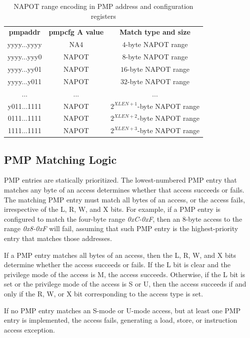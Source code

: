 \begin{table}
  \centering
  \begin{tabular}{|c|c|c|}
    \hline
    \textbf{pmpaddr}          & \textbf{pmpcfg A value} & \textbf{Match type and size}  \\
    \hhline {===} yyyy...yyyy & NA4                     & $4$-byte NAPOT range          \\
    \hline
    yyyy...yyy0               & NAPOT                   & $8$-byte NAPOT range          \\
    \hline
    yyyy...yy01               & NAPOT                   & $16$-byte NAPOT range         \\
    \hline
    yyyy...y011               & NAPOT                   & $32$-byte NAPOT range         \\
    \hline
    ...                       & ...                     & ...                           \\
    \hline
    y011...1111               & NAPOT                   & $2^{XLEN+1}$-byte NAPOT range \\
    \hline
    0111...1111               & NAPOT                   & $2^{XLEN+2}$-byte NAPOT range \\
    \hline
    1111...1111               & NAPOT                   & $2^{XLEN+3}$-byte NAPOT range \\
    \hline
  \end{tabular}
  \caption{NAPOT range encoding in PMP address and configuration registers}
  \label{tab:napotencodings}
\end{table}

\subsection{PMP Matching Logic}
\label{subsec:matchinglogic}

PMP entries are statically prioritized. The lowest-numbered PMP entry that
matches any byte of an access determines whether that access succeeds or fails. The
matching PMP entry must match all bytes of an access, or the access fails, irrespective
of the L, R, W, and X bits. For example, if a PMP entry is configured to match
the four-byte range \textit{0xC-0xF}, then an $8$-byte access to the range
\textit{0x8-0xF} will fail, assuming that such PMP entry is the highest-priority
entry that matches those addresses.

If a PMP entry matches all bytes of an access, then the L, R, W, and X bits
determine whether the access succeeds or fails. If the L bit is clear and the privilege
mode of the access is M, the access succeeds. Otherwise, if the L bit is set or
the privilege mode of the access is S or U, then the access succeeds if and only
if the R, W, or X bit corresponding to the access type is set.

If no PMP entry matches an S-mode or U-mode access, but at least one PMP entry
is implemented, the access fails, generating a load, store, or instruction
access exception.
